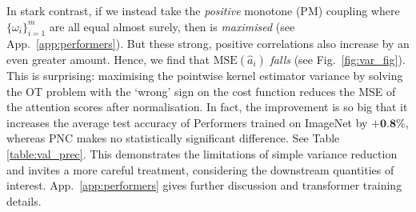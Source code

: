 In stark contrast, if we instead take the \emph{positive} monotone (PM) coupling where $\{\omega_i\}_{i=1}^m$ are all equal almost surely, then  is \emph{maximised} (see App.~\ref{app:performers}).
But these strong, positive correlations also increase  by an even greater amount. 
Hence, we find that ${\textrm{MSE}(\widehat{a}_i)}$ \emph{falls} (see Fig.~\ref{fig:var_fig}).
This is surprising: maximising the pointwise kernel estimator variance by solving the OT problem with the `wrong' sign on the cost function reduces the MSE of the attention scores after normalisation. %
In fact, the improvement is so big that it increases the average test accuracy of Performers trained on ImageNet \citep{deng2009imagenet} by $\textbf{+0.8\%}$, whereas PNC makes no statistically significant difference. 
See Table \ref{table:val_prec}. 
This demonstrates the limitations of simple variance reduction and invites a more careful treatment, considering the downstream quantities of interest.
App.~\ref{app:performers} gives further discussion and transformer training details.





 









